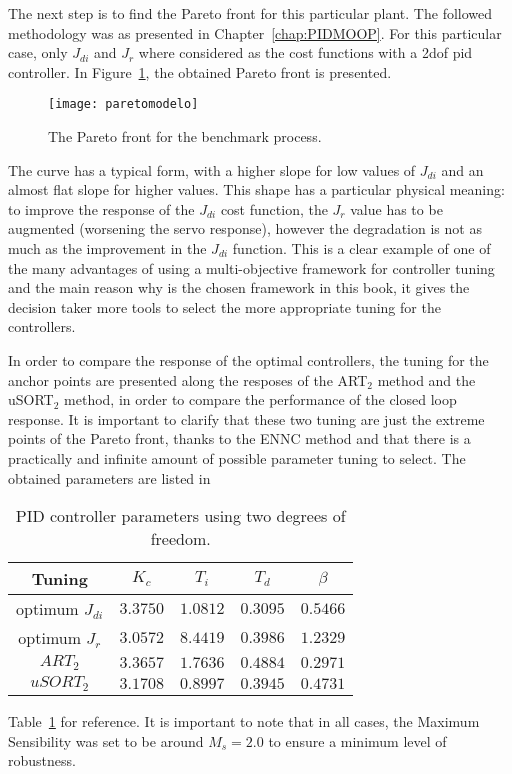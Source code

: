The next step is to find the Pareto front for this particular plant. The followed methodology was as presented in Chapter~\ref{chap:PIDMOOP}. For this particular case, only $J_{di}$ and $J_r$ where considered as the cost functions with a \gls{2dof} \gls{pid} controller. In Figure~\ref{fig:paretomodelo}, the obtained Pareto front is presented. 
\begin{figure}[tb]%
	\centering
	\texttt{[image: paretomodelo]}%
	\caption{The Pareto front for the benchmark process.}%
	\label{fig:paretomodelo}%
\end{figure}

The curve has a typical form, with a higher slope for low values of $J_{di}$ and an almost flat slope for higher values. This shape has a particular physical meaning: to improve the response of the $J_{di}$ cost function, the $J_{r}$ value has to be augmented (worsening the servo response), however the degradation is not as much as the improvement in the $J_{di}$ function. This is a clear example of one of the many advantages of using a multi-objective framework for controller tuning and the main reason why is the chosen framework in this book, it gives the decision taker more tools to select the more appropriate tuning for the controllers.

In order to compare the response of the optimal controllers, the tuning for the anchor points are presented along the resposes of the ART$_2$ method \citep{Vilanova2011} and the uSORT$_2$ method\citep{Alfaro2012a}, in order to compare the performance of the closed loop response. It is important to clarify that these two tuning are just the extreme points of the Pareto front, thanks to the ENNC method and that there is a practically and infinite amount of possible parameter tuning to select. The obtained parameters are listed in %
%
\begin{table}[tb]
	\caption{PID controller parameters using two degrees of freedom.}
	\centering
	\begin{tabular}{@{}*{5}{c}@{}}
		\toprule
		Tuning              &$K_c$       &$T_i$      &$T_d$     & $\beta$ 	\\
		\midrule              
		optimum $J_{di}$     &$3.3750$   & $1.0812$  &$0.3095$  &$0.5466$   \\
		optimum $J_{r}$      &$3.0572$   & $8.4419$  &$0.3986$  &$1.2329$   \\
		$ART_2$             &$3.3657$   & $1.7636$  &$0.4884$  &$0.2971$   \\
		$uSORT_2$           &$3.1708$   & $0.8997$  &$0.3945$  &$0.4731$   \\	
		\bottomrule				
	\end{tabular}
	\label{tab:parametroscontrolador}
\end{table}
%
Table~\ref{tab:parametroscontrolador} for reference. It is important to note that in all cases, the Maximum Sensibility was set to be around $M_s = 2.0$ to ensure a minimum level of robustness.

